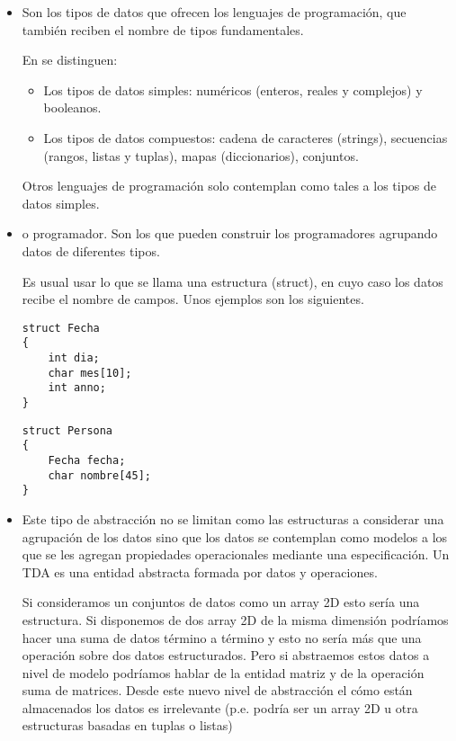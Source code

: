 \begin{itemize}
\item {} Son los tipos de datos que ofrecen los lenguajes de programación, que también reciben el nombre de tipos fundamentales. 

En  se distinguen:
\begin{itemize}
\item Los tipos de datos simples: numéricos (enteros, reales y complejos) y booleanos.
\item Los tipos de datos compuestos: cadena de caracteres (strings), secuencias (rangos, listas y tuplas), mapas (diccionarios), conjuntos.
\end{itemize}

Otros lenguajes de programación solo contemplan como tales a los tipos de datos simples.


\item {} o programador. Son los que pueden construir los programadores agrupando datos de diferentes tipos. 

Es usual usar lo que se llama una estructura (struct), en cuyo caso los datos recibe el nombre de campos. Unos ejemplos son los siguientes.

\hfil
\begin{minipage}{.3\textwidth}
\begin{Verbatim}[frame=single]
struct Fecha
{
    int dia;
    char mes[10];
    int anno;
} 
\end{Verbatim}
\end{minipage}
\begin{minipage}{.3\textwidth}
\begin{Verbatim}[frame=single]
struct Persona
{
    Fecha fecha;
    char nombre[45];
}

\end{Verbatim}
\end{minipage}


\item {} 
Este tipo de abstracción no se limitan como las estructuras a considerar una agrupación de los datos sino que los datos se contemplan como modelos a los que se les agregan propiedades operacionales mediante una especificación. Un TDA es una entidad abstracta formada por datos y operaciones.


Si consideramos un conjuntos de datos como un array 2D esto sería una estructura. Si disponemos de dos array 2D de la misma dimensión podríamos hacer una suma de datos término a término y esto no sería más que una operación sobre dos datos estructurados. Pero si abstraemos estos datos a nivel de modelo podríamos hablar de la entidad matriz y de la operación suma de matrices. Desde este nuevo nivel de abstracción el cómo están almacenados los datos es irrelevante (p.e. podría ser un array 2D u otra estructuras basadas en tuplas o listas)

\end{itemize}






